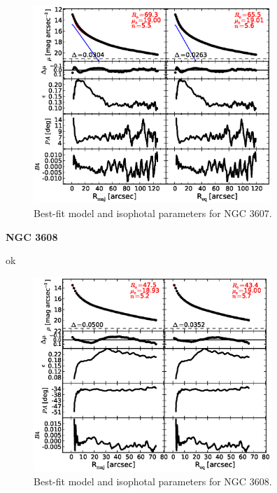 \documentclass[preprint2]{emulateapj}
\newcommand{\fitfigurewidth}{0.8\textwidth}
\begin{document}
  \begin{figure}[h]
  \begin{center}
  \includegraphics[width=\fitfigurewidth]{images/n3607_1Dfit.eps}
  \caption{Best-fit model and isophotal parameters for NGC 3607.}
  \end{center}
  \end{figure}

  \clearpage\newpage\noindent

  {\bf NGC 3608 \\}

  ok

  \begin{figure}[h]
  \begin{center}
  \includegraphics[width=\fitfigurewidth]{images/n3608_1Dfit.eps}
  \caption{Best-fit model and isophotal parameters for NGC 3608.}
  \end{center}
  \end{figure}
\end{document}
